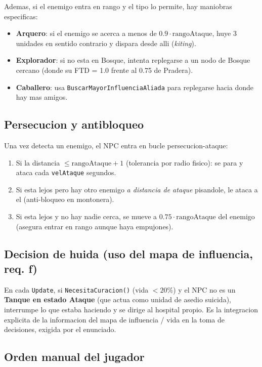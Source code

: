 \documentclass[12pt,a4paper]{article}
\begin{document}
Ademas, si el enemigo entra en rango y el tipo lo permite, hay
maniobras especificas:

\begin{itemize}[leftmargin=1.5em]
    \item \textbf{Arquero}: si el enemigo se acerca a menos de $0.9 \cdot \text{rangoAtaque}$, huye 3 unidades en sentido contrario y dispara desde alli (\emph{kiting}).
    \item \textbf{Explorador}: si no esta en Bosque, intenta replegarse a un nodo de Bosque cercano (donde su FTD = 1.0 frente al 0.75 de Pradera).
    \item \textbf{Caballero}: usa \texttt{BuscarMayorInfluenciaAliada} para replegarse hacia donde hay mas amigos.
\end{itemize}

\subsection{Persecucion y antibloqueo}

Una vez detecta un enemigo, el NPC entra en bucle persecucion-ataque:

\begin{enumerate}[leftmargin=1.5em]
    \item Si la distancia $\leq \text{rangoAtaque} + 1$ (tolerancia por radio fisico): se para y ataca cada \texttt{velAtaque} segundos.
    \item Si esta lejos pero hay otro enemigo \emph{a distancia de ataque} pisandole, le ataca a el (anti-bloqueo en montonera).
    \item Si esta lejos y no hay nadie cerca, se mueve a $0.75 \cdot \text{rangoAtaque}$ del enemigo (asegura entrar en rango aunque haya empujones).
\end{enumerate}

\subsection{Decision de huida (uso del mapa de influencia, req. f)}

En cada \texttt{Update}, si \texttt{NecesitaCuracion()} (vida $< 20\%$)
y el NPC no es un \textbf{Tanque en estado Ataque} (que actua como
unidad de asedio suicida), interrumpe lo que estaba haciendo y se
dirige al hospital propio. Es la integracion explicita de la
informacion del mapa de influencia / vida en la toma de decisiones,
exigida por el enunciado.

\subsection{Orden manual del jugador}
\end{document}
